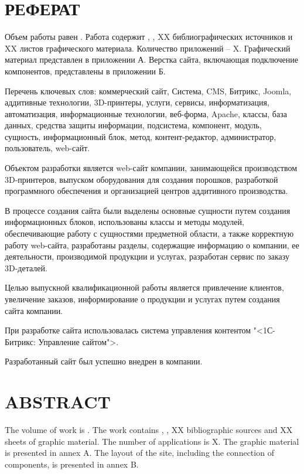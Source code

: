 \newsection
\section*{РЕФЕРАТ}

Объем работы равен . Работа содержит , , XX библиографических источников и XX листов графического материала. Количество приложений – X. Графический материал представлен в приложении А. Верстка сайта, включающая подключение компонентов, представлены в приложении Б.

Перечень ключевых слов: коммерческий сайт, Система, CMS, Битрикс, Joomla, аддитивные технологии, 3D-принтеры, услуги, сервисы, информатизация, автоматизация, информационные технологии, веб-форма,  Apache, классы, база данных, средства защиты информации, подсистема, компонент, модуль, сущность, информационный блок, метод, контент-редактор, администратор, пользователь, web-сайт.

Объектом разработки является web-сайт компании,  занимающейся \linebreak производством 3D-принтеров, выпуском оборудования для создания порошков, разработкой программного обеспечения и организацией центров аддитивного производства.

В процессе создания сайта были выделены основные сущности путем создания информационных блоков, использованы классы и методы модулей, обеспечивающие работу с сущностями предметной области, а также корректную работу web-сайта, разработаны разделы, содержащие информацию о компании, ее деятельности, производимой продукции и услугах, разработан сервис по заказу 3D-деталей.

Целью выпускной квалификационной работы является \linebreak привлечение клиентов, увеличение заказов, информирование о продукции и услугах путем создания сайта компании.

При разработке сайта использовалась система управления контентом "<1С-Битрикс: Управление сайтом">.

Разработанный сайт был успешно внедрен в компании.
\newpage
{}
\section*{ABSTRACT}
  
The volume of work is . The work contains , , XX bibliographic sources and XX sheets of graphic material. The number of applications is X. The graphic material is presented in annex A. The layout of the site, including the connection of components, is presented in annex B.

